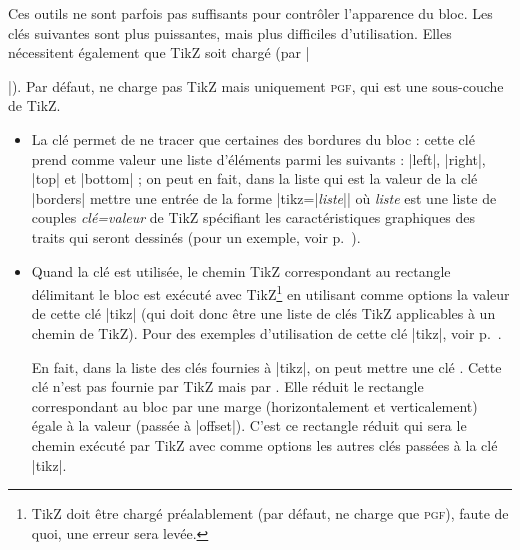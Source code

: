 \documentclass[dvipsnames]{article}%
\begin{document}
\medskip
Ces outils ne sont parfois pas suffisants pour contrôler l'apparence du bloc.
Les clés suivantes sont plus puissantes, mais plus difficiles d'utilisation.
Elles nécessitent également que TikZ soit chargé (par |\usepackage{tikz}|). Par
défaut,  ne charge pas TikZ mais uniquement \textsc{pgf}, qui
est une sous-couche de TikZ.
\begin{itemize}
\item {} 
La clé  permet de ne tracer que certaines des bordures
du bloc : cette clé prend comme valeur une liste d'éléments parmi les suivants :
|left|, |right|, |top| et |bottom| ; on peut en fait, dans la liste qui est la
valeur de la clé |borders| mettre une entrée de la forme
|tikz={|\textsl{liste}|}| où \textsl{liste} est une liste de couples
\textsl{clé=valeur} de TikZ spécifiant les caractéristiques graphiques des
traits qui seront dessinés (pour un exemple, voir p.~\pageref{tiretes}).

\item {}
Quand la clé  est utilisée, le chemin TikZ correspondant
au rectangle délimitant le bloc est exécuté avec TikZ\footnote{TikZ doit être
  chargé préalablement (par défaut,  ne charge que
  \textsc{pgf}), faute de quoi, une erreur sera levée.} en utilisant comme
options la valeur de cette clé |tikz| (qui doit donc être une liste de clés TikZ
applicables à un chemin de TikZ). Pour des exemples d'utilisation de cette clé
|tikz|, voir p.~\pageref{tikz-key-examples}.

En fait, dans la liste des clés fournies à |tikz|, on peut mettre une clé
. Cette clé n'est pas fournie par TikZ mais par
. Elle réduit le rectangle correspondant au bloc par une marge
(horizontalement et verticalement) égale à la valeur (passée à |offset|). C'est
ce rectangle réduit qui sera le chemin exécuté par TikZ avec comme options les
autres clés passées à la clé |tikz|.
\end{itemize}
\end{document}
